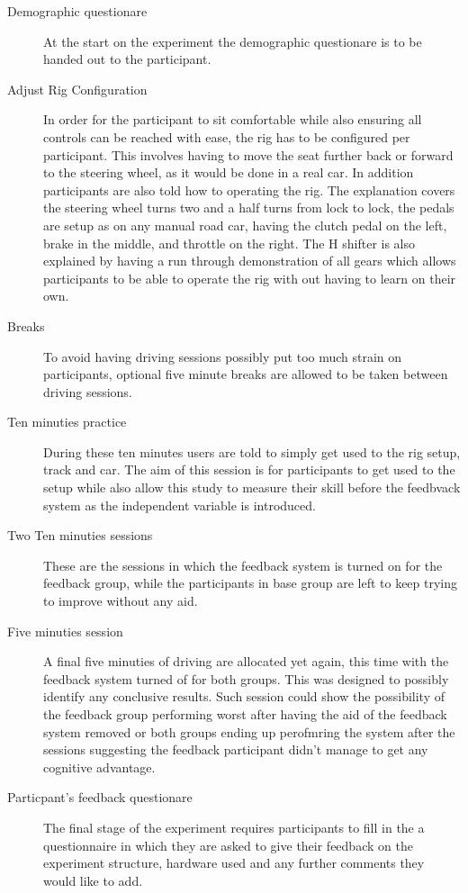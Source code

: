 \begin{description}
\item[Demographic questionare] At the start on the experiment the demographic questionare is to be handed out to the participant.
	
\item[Adjust Rig Configuration] In order for the participant to sit comfortable while also ensuring all controls can be reached with ease, the rig has to be configured per participant. This involves having to move the seat further back or forward to the steering wheel, as it would be done in a real car. In addition participants are also told how to operating the rig. The explanation covers the steering wheel turns two and a half turns from lock to lock, the pedals are setup as on any manual road car, having the clutch pedal on the left, brake in the middle, and throttle on the right. The H shifter is also explained by having a run through demonstration of all gears which allows participants to be able to operate the rig with out having to learn on their own.

\item[Breaks] To avoid having driving sessions possibly put too much strain on participants, optional five minute breaks are allowed to be taken between driving sessions. 

\item[Ten minuties practice] During these ten minutes users are told to simply get used to the rig setup, track and car. The aim of this session is for participants to get used to the setup while also allow this study to measure their skill before the feedbvack system as the independent variable is introduced.

\item[Two Ten minuties sessions] These are the sessions in which the feedback system is turned on for the feedback group, while the participants in base group are left to keep trying to improve without any aid. 

\item[Five minuties session] A final five minuties of driving are allocated yet again, this time with the feedback system turned of for both groups. This was designed to possibly identify any conclusive results. Such session could show the possibility of the feedback group performing worst after having the aid of the feedback system removed or both groups ending up perofmring the system after the sessions suggesting the feedback participant didn't manage to get any cognitive advantage.

\item[Particpant's feedback questionare] The final stage of the experiment requires participants to fill in the a questionnaire  in which they are asked to give their feedback on the experiment structure, hardware used and any further comments they would like to add.

\end{description}

